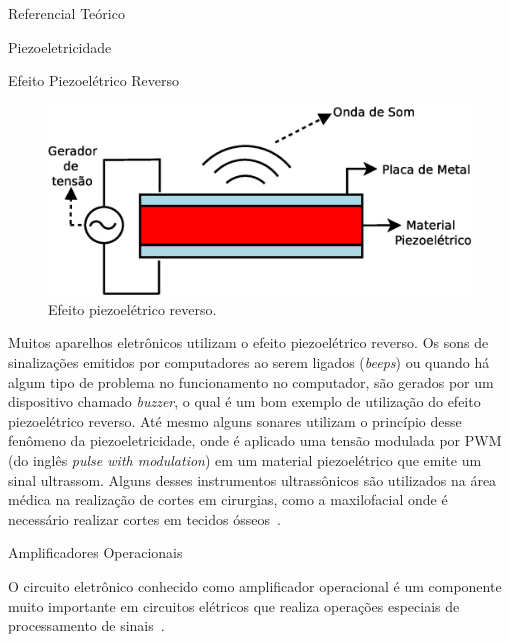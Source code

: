 \begin{chapter}{Referencial Teórico}
\begin{section}{Piezoeletricidade}
\begin{subsection}{Efeito Piezoelétrico Reverso}
\begin{figure}[!h]
	\centering
	\begin{minipage}[c]{\textwidth}
	\centering
	\includegraphics[width=0.8\linewidth]{fig/EfeitoPiezoEletricoReverso}
	\caption{Efeito piezoelétrico reverso.}
	\label{fig:reverso}
	\end{minipage}
\end{figure}

Muitos aparelhos eletrônicos utilizam o efeito piezoelétrico reverso. Os sons de
sinalizações emitidos por computadores ao serem ligados (\textit{beeps}) ou
quando há algum tipo de problema no funcionamento no computador, são gerados por
um dispositivo chamado \textit{buzzer}, o qual é um bom exemplo de utilização do
efeito piezoelétrico reverso.  Até mesmo alguns sonares utilizam o princípio
desse fenômeno da piezoeletricidade, onde é aplicado uma tensão modulada por PWM
(do inglês \textit{pulse with modulation}) em um material piezoelétrico que
emite um sinal ultrassom. Alguns desses instrumentos ultrassônicos são
utilizados na área médica na realização de cortes em cirurgias, como a
maxilofacial onde é necessário realizar cortes em tecidos
ósseos~\cite{Carvalho17}. 
 
\end{subsection}

\end{section}

\begin{section}{Amplificadores Operacionais} 

O circuito eletrônico conhecido como amplificador operacional é um componente
muito importante em circuitos elétricos que realiza operações especiais de
processamento de sinais~\cite{Richard2000}. 


\end{section}
\end{chapter}

